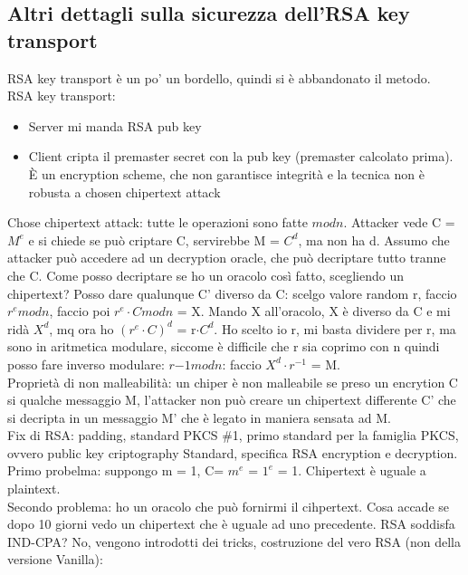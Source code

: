 \documentclass[16px]{article}
\begin{document}
\subsection{Altri dettagli sulla sicurezza dell'RSA key transport}
RSA key transport è un po' un bordello, quindi si è abbandonato il metodo.\\ RSA key transport:
\begin{itemize}
\item Server mi manda RSA pub key
\item Client cripta il premaster secret con la pub key (premaster calcolato prima). È un encryption scheme, che non garantisce integrità e la tecnica non è robusta a chosen chipertext attack
\end{itemize}
Chose chipertext attack: tutte le operazioni sono fatte $modn$. Attacker vede C = $M^e$ e si chiede se può criptare C, servirebbe M = $C^d$, ma non ha d. Assumo che attacker può accedere ad un decryption oracle, che può decriptare tutto tranne che C. Come posso decriptare se ho un oracolo così fatto, scegliendo un chipertext? Posso dare qualunque C' diverso da C: scelgo valore random r, faccio $r^emodn$, faccio poi $r^e \cdot Cmodn$ = X. Mando X all'oracolo, X è diverso da C e mi ridà $X^d$, mq ora ho $(r^e \cdot C)^d$ = r$\cdot C^d$. Ho scelto io r, mi basta dividere per r, ma sono in aritmetica modulare, siccome è difficile che r sia coprimo con n quindi posso fare inverso modulare: $r{-1}modn$: faccio $X^d \cdot r^{-1}$ = M.\\ Proprietà di non malleabilità: un chiper è non  malleabile se preso un encrytion C si qualche messaggio M, l'attacker non può creare un chipertext differente C' che si decripta in un messaggio M' che è legato in maniera sensata ad M.\\ Fix di RSA: padding, standard
PKCS \#1, primo standard per la famiglia PKCS, ovvero public key criptography Standard, specifica RSA encryption e decryption.\\ Primo probelma: suppongo m = 1, C= $m^e$ = $1^e$ = 1. Chipertext è uguale a plaintext.\\ Secondo problema: ho un oracolo che può fornirmi il cihpertext. Cosa accade se dopo 10 giorni vedo un chipertext che è uguale ad uno precedente. RSA soddisfa IND-CPA? No, vengono introdotti dei tricks, costruzione del vero RSA (non della versione Vanilla):
\end{document}
